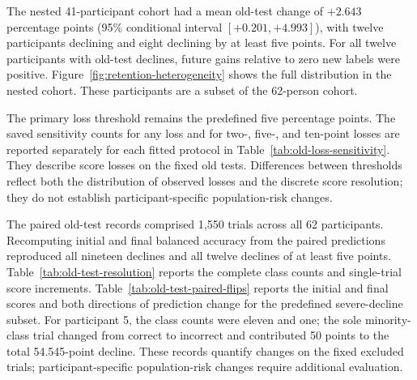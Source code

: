 \documentclass[11pt,a4paper]{article}
\begin{document}
The nested 41-participant cohort had a mean old-test change of $+2.643$ percentage points (95\% conditional interval $[+0.201,+4.993]$), with twelve participants declining and eight declining by at least five points. For all twelve participants with old-test declines, future gains relative to zero new labels were positive. Figure~\ref{fig:retention-heterogeneity} shows the full distribution in the nested cohort. These participants are a subset of the 62-person cohort.

The primary loss threshold remains the predefined five percentage points. The saved sensitivity counts for any loss and for two-, five-, and ten-point losses are reported separately for each fitted protocol in Table~\ref{tab:old-loss-sensitivity}. They describe score losses on the fixed old tests. Differences between thresholds reflect both the distribution of observed losses and the discrete score resolution; they do not establish participant-specific population-risk changes.

The paired old-test records comprised 1,550 trials across all 62 participants. Recomputing initial and final balanced accuracy from the paired predictions reproduced all nineteen declines and all twelve declines of at least five points. Table~\ref{tab:old-test-resolution} reports the complete class counts and single-trial score increments. Table~\ref{tab:old-test-paired-flips} reports the initial and final scores and both directions of prediction change for the predefined severe-decline subset. For participant 5, the class counts were eleven and one; the sole minority-class trial changed from correct to incorrect and contributed 50 points to the total 54.545-point decline. These records quantify changes on the fixed excluded trials; participant-specific population-risk changes require additional evaluation.
\end{document}
